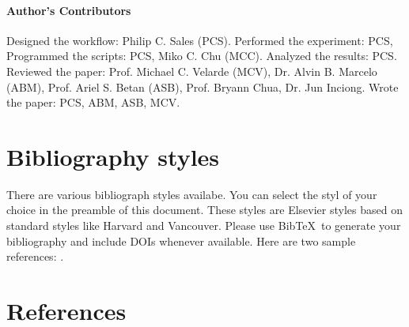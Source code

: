 \documentclass[review]{elsarticle}
\begin{document}
\paragraph{Author's Contributors} Designed the workflow: Philip C. Sales (PCS). Performed the experiment: PCS, Programmed the scripts: PCS, Miko C. Chu (MCC). Analyzed the results: PCS. Reviewed the paper: Prof. Michael C. Velarde (MCV), Dr. Alvin B. Marcelo (ABM), Prof. Ariel S. Betan (ASB), Prof. Bryann Chua, Dr. Jun Inciong. Wrote the paper: PCS, ABM, ASB, MCV.

\section{Bibliography styles}

There are various bibliograph styles availabe. You can select the styl of your choice in the preamble of this document. These styles are Elsevier styles based on standard styles like Harvard and Vancouver. Please use Bib\TeX\ to generate your bibliography and include DOIs whenever available.
Here are two sample references: \cite{Feynman1963118,Dirac1953888}.
\cite{V.Abramova201314}

\section*{References}


\end{document}
